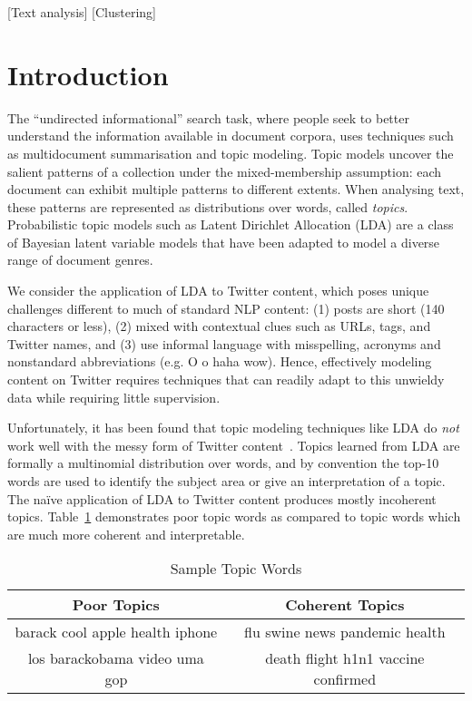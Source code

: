 \documentclass{sig-alternate}
\begin{document}
[Text analysis]
[Clustering]

\section{Introduction}
\label{sec:intro}

The ``undirected informational'' search task, where people seek to
better understand the information available in document corpora, uses
techniques such as multidocument summarisation and topic modeling.
Topic models uncover the salient patterns of a collection under the
mixed-membership assumption: each document can exhibit multiple
patterns to different extents.  When analysing text, these patterns
are represented as distributions over words, called \textit{topics}.
Probabilistic topic models such as Latent Dirichlet Allocation (LDA)
\cite{blei03} are a class of Bayesian latent variable models that have
been adapted to model a diverse range of document genres.

We consider the application of LDA to Twitter content, which poses
unique challenges different to much of standard NLP content: (1) posts
are short (140 characters or less), (2) mixed with contextual clues
such as URLs, tags, and Twitter names, and (3) use informal language
with misspelling, acronyms and nonstandard abbreviations (e.g. O o
haha wow).  Hence, effectively modeling content on Twitter requires
techniques that can readily adapt to this unwieldy data while
requiring little supervision.

Unfortunately, it has been found that topic modeling techniques like
LDA do \emph{not} work well with the messy form of Twitter
content~\cite{wayne}.  Topics learned from LDA are formally a
multinomial distribution over words, and by convention the top-10
words are used to identify the subject area or give an interpretation
of a topic.  The na\"{i}ve application of LDA to Twitter content
produces mostly incoherent topics.  Table~\ref{tbl-0} demonstrates
poor topic words as compared to topic words which are much more
coherent and interpretable.

\begin{table}[t!]
\centering
\caption{Sample Topic Words}\label{tbl-0}
\resizebox{8.5cm}{!} 
{
	\begin{tabular}{|c|c|}
	\hline
        Poor Topics  & Coherent Topics \\
\hline
 {\small barack cool apple health iphone}
 &
 {\small flu swine news pandemic health}\\
 {\small los barackobama video uma gop} & 
{\small death flight h1n1 vaccine confirmed} \\
 \hline
	\end{tabular}
}\vspace*{-10pt}
\end{table}
\end{document}
